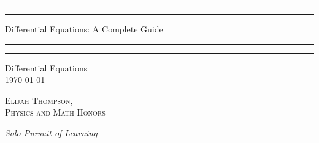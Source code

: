 \documentclass[12pt, a4paper, oneside, openright, titlepage]{book}
\begin{document}

\begin{titlepage}
    \centering
    \scshape
    \vspace*{\baselineskip}
    \rule{\textwidth}{1.6pt}\vspace*{-\baselineskip}\vspace*{2pt}
    \rule{\textwidth}{0.4pt}
    
    \vspace{0.75\baselineskip}
    
    {\LARGE Differential Equations: A Complete Guide}
    
    \vspace{0.75\baselineskip}
    
    \rule{\textwidth}{0.4pt}\vspace*{-\baselineskip}\vspace{3.2pt}
    \rule{\textwidth}{1.6pt}
    
    \vspace{2\baselineskip}
    Differential Equations \\
    \vspace*{3\baselineskip}
    \monthdayyeardate\today \\
    \vspace*{5.0\baselineskip}
    
    {\scshape\Large Elijah Thompson, \\ Physics and Math Honors\\}
    
    \vspace{1.0\baselineskip}
    \textit{Solo Pursuit of Learning}
    \vfill
    \enlargethispage{1in}
    \begin{figure}[b!]
    \end{figure}
\end{titlepage}
\end{document}
